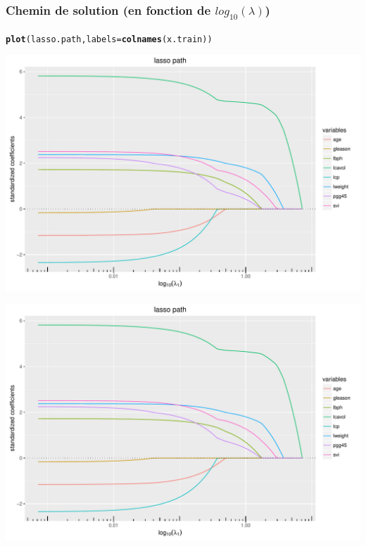 \documentclass{beamer}\usepackage[]{graphicx}\usepackage[]{color}
\makeatletter
\newcommand{\hlstd}[1]{\textcolor[rgb]{0.345,0.345,0.345}{#1}}%
\newcommand{\hlkwc}[1]{\textcolor[rgb]{0.333,0.667,0.333}{#1}}%
\newcommand{\hlkwd}[1]{\textcolor[rgb]{0.737,0.353,0.396}{\textbf{#1}}}%
\newenvironment{kframe}{%
 \def\at@end@of@kframe{}%
 \ifinner\ifhmode%
  \def\at@end@of@kframe{\end{minipage}}%
  \begin{minipage}{\columnwidth}%
 \fi\fi%
 \def\FrameCommand##1{\hskip\@totalleftmargin \hskip-\fboxsep
 \colorbox{shadecolor}{##1}\hskip-\fboxsep
     \hskip-\linewidth \hskip-\@totalleftmargin \hskip\columnwidth}%
 \MakeFramed {\advance\hsize-\width
   \@totalleftmargin\z@ \linewidth\hsize
   \@setminipage}}%
 {\par\unskip\endMakeFramed%
 \at@end@of@kframe}
\newenvironment{knitrout}{}{} %
\makeatother
\begin{document}
\begin{frame}[containsverbatim]
  \frametitle{Chemin de solution (en fonction de $log_{10}(\lambda)$)}

\begin{knitrout}\scriptsize
{}\color{fgcolor}\begin{kframe}
\begin{alltt}
\hlkwd{plot}\hlstd{(lasso.path,} \hlkwc{labels}\hlstd{=}\hlkwd{colnames}\hlstd{(x.train))}
\end{alltt}
\end{kframe}
\includegraphics[width=\textwidth]{figures/lasso-unnamed-chunk-66-1} 

\includegraphics[width=\textwidth]{figures/lasso-unnamed-chunk-66-2} 

\end{knitrout}
\end{frame}
\end{document}
